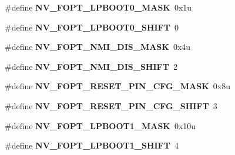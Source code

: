 \begin{DoxyCompactItemize}
\item 
\hypertarget{group___n_v___register___masks_ga47bf10ef60ce96fc8d7fdbd7378d9a52}{}\#define {\bfseries N\+V\+\_\+\+F\+O\+P\+T\+\_\+\+L\+P\+B\+O\+O\+T0\+\_\+\+M\+A\+S\+K}~0x1u\label{group___n_v___register___masks_ga47bf10ef60ce96fc8d7fdbd7378d9a52}

\item 
\hypertarget{group___n_v___register___masks_ga342e15fe4074c4a1bef9dcd73b312b56}{}\#define {\bfseries N\+V\+\_\+\+F\+O\+P\+T\+\_\+\+L\+P\+B\+O\+O\+T0\+\_\+\+S\+H\+I\+F\+T}~0\label{group___n_v___register___masks_ga342e15fe4074c4a1bef9dcd73b312b56}

\item 
\hypertarget{group___n_v___register___masks_gaa2bcf41c89cbfe86ef8eaf6fff2ad068}{}\#define {\bfseries N\+V\+\_\+\+F\+O\+P\+T\+\_\+\+N\+M\+I\+\_\+\+D\+I\+S\+\_\+\+M\+A\+S\+K}~0x4u\label{group___n_v___register___masks_gaa2bcf41c89cbfe86ef8eaf6fff2ad068}

\item 
\hypertarget{group___n_v___register___masks_ga8a4632e08257c81a80d8be3cdac911f9}{}\#define {\bfseries N\+V\+\_\+\+F\+O\+P\+T\+\_\+\+N\+M\+I\+\_\+\+D\+I\+S\+\_\+\+S\+H\+I\+F\+T}~2\label{group___n_v___register___masks_ga8a4632e08257c81a80d8be3cdac911f9}

\item 
\hypertarget{group___n_v___register___masks_ga4b475b316319ff2d76d026ca0a9df50a}{}\#define {\bfseries N\+V\+\_\+\+F\+O\+P\+T\+\_\+\+R\+E\+S\+E\+T\+\_\+\+P\+I\+N\+\_\+\+C\+F\+G\+\_\+\+M\+A\+S\+K}~0x8u\label{group___n_v___register___masks_ga4b475b316319ff2d76d026ca0a9df50a}

\item 
\hypertarget{group___n_v___register___masks_ga9ea43f031c7695bdbf13c5168dabee6d}{}\#define {\bfseries N\+V\+\_\+\+F\+O\+P\+T\+\_\+\+R\+E\+S\+E\+T\+\_\+\+P\+I\+N\+\_\+\+C\+F\+G\+\_\+\+S\+H\+I\+F\+T}~3\label{group___n_v___register___masks_ga9ea43f031c7695bdbf13c5168dabee6d}

\item 
\hypertarget{group___n_v___register___masks_ga0152e105ece0b627e9d8ffea2ec30cd9}{}\#define {\bfseries N\+V\+\_\+\+F\+O\+P\+T\+\_\+\+L\+P\+B\+O\+O\+T1\+\_\+\+M\+A\+S\+K}~0x10u\label{group___n_v___register___masks_ga0152e105ece0b627e9d8ffea2ec30cd9}

\item 
\hypertarget{group___n_v___register___masks_ga5acee776b6df2ef3408eb72e2caed133}{}\#define {\bfseries N\+V\+\_\+\+F\+O\+P\+T\+\_\+\+L\+P\+B\+O\+O\+T1\+\_\+\+S\+H\+I\+F\+T}~4\label{group___n_v___register___masks_ga5acee776b6df2ef3408eb72e2caed133}


\end{DoxyCompactItemize}
